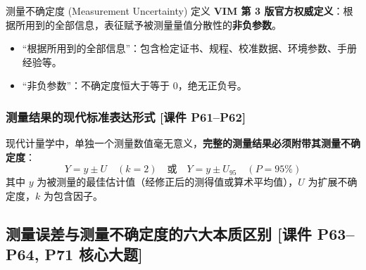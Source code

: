 \documentclass[11pt,a4paper]{ctexart}
\begin{document}
\begin{defbox}{测量不确定度 (Measurement Uncertainty) 定义}
\textbf{VIM 第 3 版官方权威定义}：根据所用到的全部信息，表征赋予被测量量值分散性的\textbf{非负参数}。
\begin{itemize}
    \item “根据所用到的全部信息”：包含检定证书、规程、校准数据、环境参数、手册经验等。
    \item “非负参数”：不确定度恒大于等于 0，绝无正负号。
\end{itemize}
\end{defbox}

\subsubsection{测量结果的现代标准表达形式 [课件 P61--P62]}
现代计量学中，单独一个测量数值毫无意义，\textbf{完整的测量结果必须附带其测量不确定度}：
\begin{equation}
    Y = y \pm U \quad (k = 2) \quad \text{或} \quad Y = y \pm U_{95} \quad (P = 95\%)
\end{equation}
其中 $y$ 为被测量的最佳估计值（经修正后的测得值或算术平均值），$U$ 为扩展不确定度，$k$ 为包含因子。

\subsection{测量误差与测量不确定度的六大本质区别 \textnormal{[课件 P63--P64, P71 核心大题]}}
\end{document}
